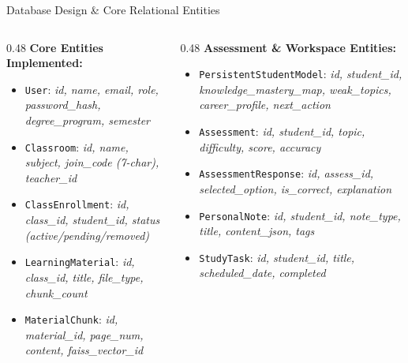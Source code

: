 \documentclass[aspectratio=169,10pt]{beamer}
\begin{document}
\begin{frame}{Database Design & Core Relational Entities}
  \begin{columns}[T]
    \begin{column}{0.48\textwidth}
      \small
      \textbf{Core Entities Implemented:}
      \begin{itemize}
        \item \texttt{User}: \textit{id, name, email, role, password\_hash, degree\_program, semester}
        \item \texttt{Classroom}: \textit{id, name, subject, join\_code (7-char), teacher\_id}
        \item \texttt{ClassEnrollment}: \textit{id, class\_id, student\_id, status (active/pending/removed)}
        \item \texttt{LearningMaterial}: \textit{id, class\_id, title, file\_type, chunk\_count}
        \item \texttt{MaterialChunk}: \textit{id, material\_id, page\_num, content, faiss\_vector\_id}
      \end{itemize}
    \end{column}
    \begin{column}{0.48\textwidth}
      \small
      \textbf{Assessment \& Workspace Entities:}
      \begin{itemize}
        \item \texttt{PersistentStudentModel}: \textit{id, student\_id, knowledge\_mastery\_map, weak\_topics, career\_profile, next\_action}
        \item \texttt{Assessment}: \textit{id, student\_id, topic, difficulty, score, accuracy}
        \item \texttt{AssessmentResponse}: \textit{id, assess\_id, selected\_option, is\_correct, explanation}
        \item \texttt{PersonalNote}: \textit{id, student\_id, note\_type, title, content\_json, tags}
        \item \texttt{StudyTask}: \textit{id, student\_id, title, scheduled\_date, completed}
      \end{itemize}
    \end{column}
  \end{columns}
\end{frame}
\end{document}

